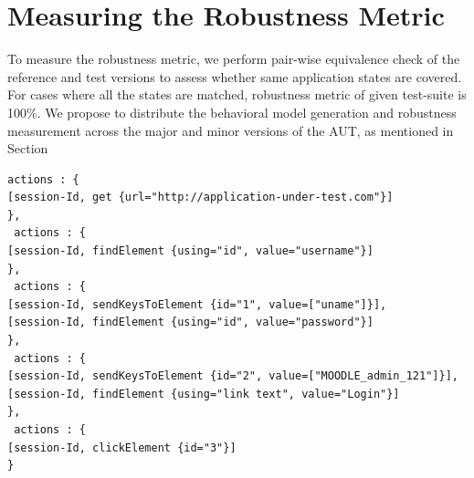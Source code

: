\section{Measuring the Robustness Metric}
\label{sec:MeasureRobMetric}
\vspace{-2mm} To measure the robustness metric, we perform pair-wise equivalence check of the reference and test versions to assess whether same application states are covered. For cases where all the states are matched, robustness metric of given test-suite is 100\%. We propose to distribute the behavioral model generation and robustness measurement across the major and minor versions of the AUT, as mentioned in Section


\begin{center}
\begin{scriptsize}
\centering
\lstset{
  basicstyle=\ttfamily,
  columns=fullflexible,
  keepspaces=true,
}
  
\begin{lstlisting}[caption=Page-Objects design for \texttt{loginTest},label=code2]
actions : { 
[session-Id, get {url="http://application-under-test.com"}]
},
 actions : { 
[session-Id, findElement {using="id", value="username"}]
},
 actions : { 
[session-Id, sendKeysToElement {id="1", value=["uname"]}],
[session-Id, findElement {using="id", value="password"}]
},
 actions : { 
[session-Id, sendKeysToElement {id="2", value=["MOODLE_admin_121"]}],
[session-Id, findElement {using="link text", value="Login"}]
},
 actions : { 
[session-Id, clickElement {id="3"}]
}
\end{lstlisting}
\end{scriptsize} 
\end{center}